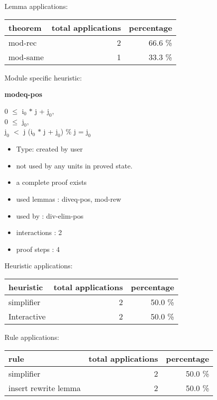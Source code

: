 \documentclass[a4paper]{article}
\begin{document}
Lemma applications:

\begin{supertabular}{l|r|r}
theorem	        & total applications & percentage \\ \hline
mod-rec & 2 & 66.6 \% \\
mod-same & 1 & 33.3 \% \\

\end{supertabular}

Module specific heuristic:

\pagebreak

{\LARGE\bf modeq-pos}\label{lemma-modeq-pos}

\medskip

0 $\le$ $\mbox{i}_{0}$ $*$ j + $\mbox{j}_{0}$, \\
0 $\le$ $\mbox{j}_{0}$, \\
$\mbox{j}_{0}$ $<$ j \Fol ($\mbox{i}_{0}$ $*$ j + $\mbox{j}_{0}$) \% j = $\mbox{j}_{0}$

\begin{itemize}

\item Type: created by user

\item not used by any units in proved state.
\item       a complete proof exists
\item       used lemmas  : diveq-pos, mod-rew
\item       used by      : div-elim-pos
\item       interactions : 2
\item       proof steps  : 4
\end{itemize}

\medskip


Heuristic applications:

\begin{supertabular}{l|r|r}
heuristic	& total applications & percentage \\ \hline
simplifier & 2 & 50.0 \% \\
Interactive & 2 & 50.0 \% \\

\end{supertabular}

Rule applications:

\begin{supertabular}{l|r|r}
rule	        & total applications & percentage \\ \hline
simplifier & 2 & 50.0 \% \\
insert rewrite lemma & 2 & 50.0 \% \\

\end{supertabular}
\end{document}

